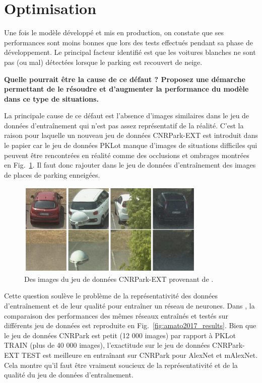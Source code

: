 \documentclass[12pt]{article}
\begin{document}
\section{Optimisation}

Une fois le modèle développé et mis en production, on constate que ses performances sont moins bonnes que lors des tests effectués pendant sa phase de développement. Le principal facteur identifié est que les voitures blanches ne sont pas (ou mal) détectées lorsque le parking est recouvert de neige.

\textbf{Quelle pourrait être la cause de ce défaut ? Proposez une démarche permettant de le résoudre et d'augmenter la performance du modèle dans ce type
de situations.}

La principale cause de ce défaut est l'absence d'images similaires dans le jeu de données d'entraînement qui n'est pas assez représentatif de la réalité. C'est la raison pour laquelle un nouveau jeu de données CNRPark-EXT est introduit dans le papier \citep{Amato2017} car le jeu de données PKLot \citep{deAlmeida2015} manque d'images de situations difficiles qui peuvent être rencontrées en réalité comme des occlusions et ombrages montrées en Fig.~\ref{fig:cnrpark_ext}. Il faut donc rajouter dans le jeu de données d'entraînement des images de places de parking enneigées.

\begin{figure}[htbp]
    \centering
    \includegraphics[width=0.8\textwidth]{figures/datasets/cnrpark_ext.png}
    \caption{Des images du jeu de données CNRPark-EXT provenant de \cite{Amato2017}.}
    \label{fig:cnrpark_ext}
\end{figure}

Cette question soulève le problème de la représentativité des données d'entraînement et de leur qualité pour entraîner un réseau de neurones. Dans \cite{Amato2017}, la comparaison des performances des mêmes réseaux entraînés et testés sur différents jeu de données est reproduite en Fig.~\ref{fig:amato2017_results}. Bien que le jeu de données CNRPark est petit (12 000 images) par rapport à PKLot TRAIN (plus de 40 000 images), l'exactitude sur le jeu de données CNRPark-EXT TEST est meilleure en entraînant sur CNRPark pour AlexNet et mAlexNet. Cela montre qu'il faut être vraiment soucieux de la représentativité et de la qualité du jeu de données d'entraînement.
\end{document}
